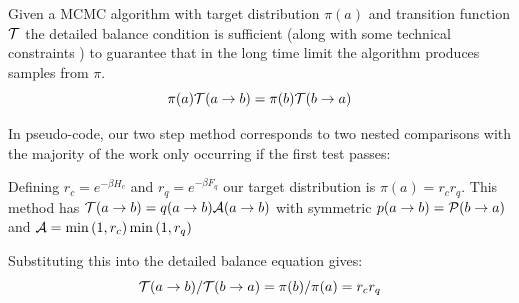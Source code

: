 Given a {MCMC} algorithm with target distribution \(\pi(a)\) and transition function \(\mathcal{T}\) the detailed balance condition is sufficient (along with some technical constraints \autocite{wolffMonteCarloErrors2004}) to guarantee that in the long time limit the algorithm produces samples from \(\pi\). \[\pi(a)\mathcal{T}(a \to b) = \pi(b)\mathcal{T}(b \to a)\]

In pseudo-code, our two step method corresponds to two nested comparisons with the majority of the work only occurring if the first test passes:

\begin{Shaded}
\begin{Highlighting}[]
\OperatorTok{=}

 
\OperatorTok{=}

\OperatorTok{=}
  \NormalTok{,}\NormalTok{) }\OperatorTok{\textless{}}\OperatorTok{{-}}\OperatorTok{*}
\OperatorTok{=}
    \NormalTok{,}\NormalTok{) }\OperatorTok{\textless{}}\OperatorTok{{-}}\OperatorTok{*}
\OperatorTok{=}

\OperatorTok{=}
\end{Highlighting}
\end{Shaded}

Defining \(r_c = e^{-\beta H_c}\) and \(r_q = e^{-\beta F_q}\) our target distribution is \(\pi(a) = r_c r_q\). This method has \(\mathcal{T}(a\to b) = q(a\to b)\mathcal{A}(a \to b)\) with symmetric \(p(a \to b) = \mathcal{P}(b \to a)\) and \(\mathcal{A} = \min\left(1, r_c\right) \min\left(1, r_q\right)\)

Substituting this into the detailed balance equation gives: \[\mathcal{T}(a \to b)/\mathcal{T}(b \to a) = \pi(b)/\pi(a) = r_c r_q\]

